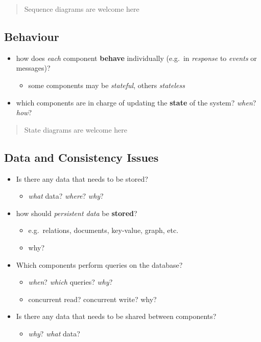 \documentclass{scrartcl}
\begin{document}
\begin{quote}
	Sequence diagrams are welcome here
\end{quote}

\subsection{Behaviour}\label{behaviour}

\begin{itemize}
	\item how does \emph{each} component \textbf{behave} individually (e.g.~in \emph{response} to \emph{events} or messages)?
	\begin{itemize}
		\item some components may be \emph{stateful}, others \emph{stateless}
	\end{itemize}
	
	\item which components are in charge of updating the \textbf{state} of the system? \emph{when}? \emph{how}?
\end{itemize}

\begin{quote}
	State diagrams are welcome here
\end{quote}

\subsection{Data and Consistency Issues}\label{data-and-consistency-issues}

\begin{itemize}
	\item Is there any data that needs to be stored?
	\begin{itemize}
		\item \emph{what} data? \emph{where}? \emph{why}?
	\end{itemize}
	
	\item how should \emph{persistent data} be \textbf{stored}?
	\begin{itemize}
		\item e.g.~relations, documents, key-value, graph, etc.
		\item why?
	\end{itemize}
	
	\item Which components perform queries on the database?
	\begin{itemize}
		\item \emph{when}? \emph{which} queries? \emph{why}?
		\item concurrent read? concurrent write? why?
	\end{itemize}
	
	\item Is there any data that needs to be shared between components?
	\begin{itemize}
		\item \emph{why}? \emph{what} data?
	\end{itemize}
\end{itemize}
\end{document}
